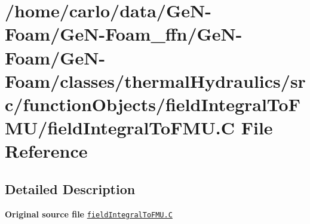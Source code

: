 \hypertarget{fieldIntegralToFMU_8C}{}\section{/home/carlo/data/\+Ge\+N-\/\+Foam/\+Ge\+N-\/\+Foam\+\_\+ffn/\+Ge\+N-\/\+Foam/\+Ge\+N-\/\+Foam/classes/thermal\+Hydraulics/src/function\+Objects/field\+Integral\+To\+F\+M\+U/field\+Integral\+To\+F\+MU.C File Reference}
\label{fieldIntegralToFMU_8C}


\subsection{Detailed Description}
{\bfseries Original source file} \href{../../../home/carlo/data/GeN-Foam/GeN-Foam_ffn/GeN-Foam/GeN-Foam/classes/thermalHydraulics/src/functionObjects/fieldIntegralToFMU/fieldIntegralToFMU.C}{\tt field\+Integral\+To\+F\+M\+U.\+C} 